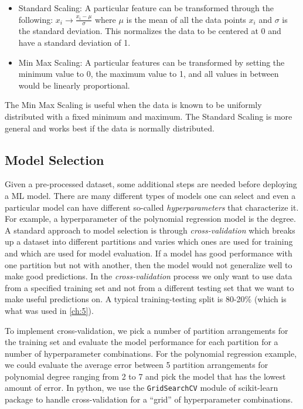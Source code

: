 \begin{itemize}
	\item Standard Scaling: A particular feature can be transformed through the following: $x_i \rightarrow \frac{x_i - \mu}{\sigma}$ where $\mu$ is the mean of all the data points $x_i$ and $\sigma$ is the standard deviation. This normalizes the data to be centered at 0 and have a standard deviation of 1. 
	\item Min Max Scaling: A particular features can be transformed by setting the minimum value to 0, the maximum value to 1, and all values in between would be linearly proportional. 
\end{itemize}
The Min Max Scaling is useful when the data is known to be uniformly distributed with a fixed minimum and maximum. The Standard Scaling is more general and works best if the data is normally distributed. 

\subsection{Model Selection}
Given a pre-processed dataset, some additional steps are needed before deploying a \gls{ML} model. There are many different types of models one can select and even a particular model can have different so-called \emph{hyperparameters} that characterize it. For example, a hyperparameter of the polynomial regression model is the degree. A standard approach to model selection is through \emph{cross-validation} which breaks up a dataset into different partitions and varies which ones are used for training and which are used for model evaluation. If a model has good performance with one partition but not with another, then the model would not generalize well to make good predictions. In the \emph{cross-validation} process we only want to use data from a specified training set and not from a different testing set that we want to make useful predictions on. A typical training-testing split is 80-20\% (which is what was used in \autoref{ch:5}). 

To implement cross-validation, we pick a number of partition arrangements for the training set and evaluate the model performance for each partition for a number of hyperparameter combinations. For the polynomial regression example, we could evaluate the average error between 5 partition arrangements for polynomial degree ranging from 2 to 7 and pick the model that has the lowest amount of error. In python, we use the \texttt{GridSearchCV} module of scikit-learn \cite{Pedregosa_2011_Scikit-Learn} package to handle cross-validation for a ``grid'' of hyperparameter combinations.

